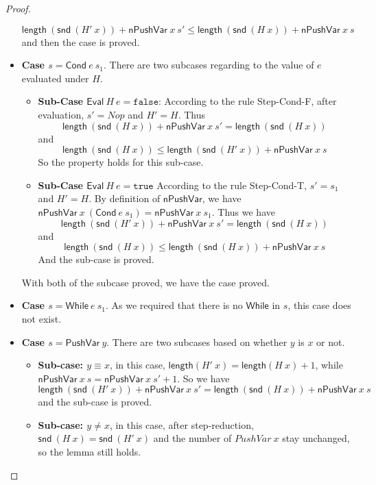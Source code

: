 \documentclass[letter, notitlepage]{article}
\begin{document}
\begin{proof}
\begin{itemize}
\begin{equation}
				\mathsf{length}~(\mathsf{snd}~(H'~x)) + \mathsf{nPushVar}~x~s' \leq \mathsf{length}~(\mathsf{snd}~(H~x)) + \mathsf{nPushVar}~x~s
			\end{equation}
			and then the case is proved.
		\item 
			\textbf{Case $s=\mathsf{Cond}~e~s_1$}.
			There are two subcases regarding to the value of $e$ evaluated under $H$.
			\begin{itemize}
				\item \textbf{Sub-Case $\mathsf{Eval}~H~e=\texttt{false}$}: According to the rule Step-Cond-F, after evaluation, $s'=Nop$ and $H'=H$. Thus 
					$$\mathsf{length}~(\mathsf{snd}~(H~x)) + \mathsf{nPushVar}~x~s' = \mathsf{length}~(\mathsf{snd}~(H~x))$$ and $$\mathsf{length}~(\mathsf{snd}~(H~x)) \leq \mathsf{length}~(\mathsf{snd}~(H'~x)) + \mathsf{nPushVar}~x~s$$
				So the property holds for this sub-case.
				\item \textbf{Sub-Case $\mathsf{Eval}~H~e=\texttt{true}$}
					According to the rule Step-Cond-T, $s'=s_1$ and $H'=H$. By definition of $\mathsf{nPushVar}$, we have $\mathsf{nPushVar}~x~(\mathsf{Cond}~e~s_1) = \mathsf{nPushVar}~x~s_1$.
					Thus we have 
					$$\mathsf{length}~(\mathsf{snd}~(H'~x)) + \mathsf{nPushVar}~x~s' = \mathsf{length}~(\mathsf{snd}~(H~x))$$ and $$\mathsf{length}~(\mathsf{snd}~(H~x)) \leq \mathsf{length}~(\mathsf{snd}~(H~x)) + \mathsf{nPushVar}~x~s$$
					And the sub-case is proved.
			\end{itemize}
			With both of the subcase proved, we have the case proved.
		\item \textbf{Case $s=\mathsf{While}~e~s_1$}. As we required that there is no $\mathsf{While}$ in $s$, this case does not exist.
		\item \textbf{Case $s=\mathsf{PushVar}~y$}.
			There are two subcases based on whether $y$ is $x$  or not.
			\begin{itemize}
				\item \textbf{Sub-case: $y\equiv x$}, in this case, $\mathsf{length} (H'~x) = \mathsf{length} (H~x) + 1$, while $\mathsf{nPushVar}~x~s = \mathsf{nPushVar}~x~s' + 1$.
					So we have 
					$$\mathsf{length}~(\mathsf{snd}~(H'~x)) + \mathsf{nPushVar}~x~s' = \mathsf{length}~(\mathsf{snd}~(H~x)) + \mathsf{nPushVar}~x~s$$
					and the sub-case is proved.
				\item \textbf{Sub-case: $y\neq x$}, in this case, after step-reduction, $\mathsf{snd}~(H~x)=\mathsf{snd}~(H'~x)$ and the number of $PushVar~x$ stay unchanged, so the lemma still holds.
			\end{itemize}

\end{itemize}
\end{proof}
\end{document}
